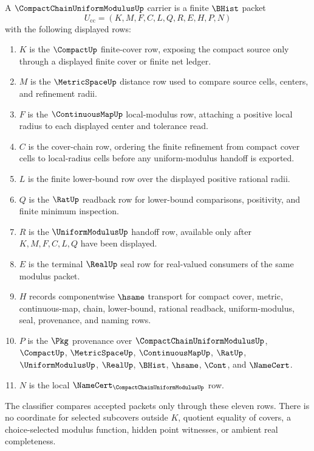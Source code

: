\begin{definition}
\label{def:compact-chain-uniform-modulus-carrier}
A $\CompactChainUniformModulusUp$ carrier is a finite $\BHist$ packet
$$
U_{\mathrm{cc}}=(K,M,F,C,L,Q,R,E,H,P,N)
$$
with the following displayed rows:
\begin{enumerate}
  \item $K$ is the $\CompactUp$ finite-cover row, exposing the compact source only through a displayed finite cover or finite net ledger.
  \item $M$ is the $\MetricSpaceUp$ distance row used to compare source cells, centers, and refinement radii.
  \item $F$ is the $\ContinuousMapUp$ local-modulus row, attaching a positive local radius to each displayed center and tolerance read.
  \item $C$ is the cover-chain row, ordering the finite refinement from compact cover cells to local-radius cells before any uniform-modulus handoff is exported.
  \item $L$ is the finite lower-bound row over the displayed positive rational radii.
  \item $Q$ is the $\RatUp$ readback row for lower-bound comparisons, positivity, and finite minimum inspection.
  \item $R$ is the $\UniformModulusUp$ handoff row, available only after $K,M,F,C,L,Q$ have been displayed.
  \item $E$ is the terminal $\RealUp$ seal row for real-valued consumers of the same modulus packet.
  \item $H$ records componentwise $\hsame$ transport for compact cover, metric, continuous-map, chain, lower-bound, rational readback, uniform-modulus, seal, provenance, and naming rows.
  \item $P$ is the $\Pkg$ provenance over $\CompactChainUniformModulusUp$, $\CompactUp$, $\MetricSpaceUp$, $\ContinuousMapUp$, $\RatUp$, $\UniformModulusUp$, $\RealUp$, $\BHist$, $\hsame$, $\Cont$, and $\NameCert$.
  \item $N$ is the local $\NameCert_{\CompactChainUniformModulusUp}$ row.
\end{enumerate}
The classifier compares accepted packets only through these eleven rows. There is no coordinate for selected subcovers outside $K$, quotient equality of covers, a choice-selected modulus function, hidden point witnesses, or ambient real completeness.
\end{definition}

